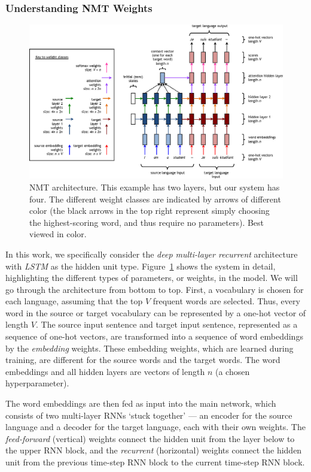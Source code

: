 \subsubsection{Understanding NMT Weights}
\label{subsubsec:lstm}
\begin{figure}[t]
\centering
\includegraphics[width=\textwidth]{img/6-2_nmt_complex} %
\caption[Weights of NMT architecture]{NMT architecture. This example has two layers, but our system has four. The different weight classes are indicated by arrows of different color (the black arrows in the top right represent simply choosing the highest-scoring word, and thus require no parameters).
Best viewed in color.
}
\label{fig:nmt_complex}
\end{figure}

In this work, we specifically consider the {\it deep multi-layer recurrent} architecture with {\it
LSTM} as the hidden unit type.
Figure~\ref{fig:nmt_complex} shows the system in detail,
highlighting the different types of parameters, or weights, in the model.
We will go through the architecture from bottom to top.
First, a vocabulary is chosen for each language, assuming that the top $V$ frequent
words are selected.
Thus, every word in the source or target vocabulary can be represented by a one-hot vector of length $V$.
The source input sentence and target input sentence, represented as a sequence
of one-hot vectors, are transformed into a sequence of word embeddings by the
\emph{embedding} weights. 
These embedding weights, which are learned during training, are different for the source words and the target words.
The word embeddings and all hidden layers are vectors of length $n$ (a chosen hyperparameter).

The word embeddings are then fed as input into the main network, which consists
of two multi-layer RNNs `stuck together' --- an encoder for the source
language and a decoder for the target language, each with their own
weights. 
The \emph{feed-forward} (vertical) weights connect
the hidden unit from the layer below to the upper RNN block, and the
\emph{recurrent} (horizontal) weights connect the hidden unit from the previous
time-step RNN block to the current time-step RNN block.

